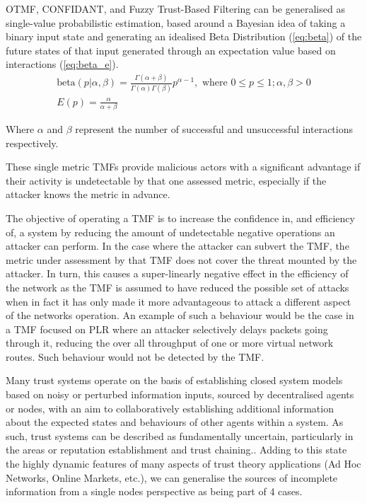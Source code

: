 OTMF, CONFIDANT, and Fuzzy Trust-Based Filtering can be generalised as single-value probabilistic estimation, based around a Bayesian idea of taking a binary input state and generating an idealised Beta Distribution (\ref{eq:beta}) of the future states of that input generated through an expectation value based on interactions (\ref{eq:beta_e}).
\begin{align}
  \label{eq:beta}
  \text{beta}(p|\alpha,\beta) = \frac{\Gamma(\alpha + \beta)}{\Gamma(\alpha)\Gamma(\beta)}p^{\alpha-1},\text{ where } 0 \leq p \leq 1; \alpha,\beta > 0\\
  \label{eq:beta_e}
  E(p) = \frac{\alpha}{\alpha + \beta}
\end{align}

Where $\alpha$ and $\beta$ represent the number of successful and unsuccessful interactions respectively.

These single metric TMFs provide malicious actors with a significant advantage if their activity is undetectable by that one assessed metric, especially if the attacker knows the metric in advance.

The objective of operating a TMF is to increase the confidence in, and efficiency of, a system by reducing the amount of undetectable negative operations an attacker can perform.
In the case where the attacker can subvert the TMF, the metric under assessment by that TMF does not cover the threat mounted by the attacker.
In turn, this causes a super-linearly negative effect in the efficiency of the network as the TMF is assumed to have reduced the possible set of attacks when in fact it has only made it more advantageous to attack a different aspect of the networks operation.
An example of such a behaviour would be the case in a TMF focused on PLR where an attacker selectively delays packets going through it, reducing the over all throughput of one or more virtual network routes.
Such behaviour would not be detected by the TMF.

Many trust systems operate on the basis of establishing closed system models based on noisy or perturbed information inputs, sourced by decentralised agents or nodes, with an aim to collaboratively establishing additional information about the expected states and behaviours of other agents within a system.
As such, trust systems can be described as fundamentally uncertain, particularly in the areas or reputation establishment and trust chaining.\cite{someone}.
Adding to this state the highly dynamic features of many aspects of trust theory applications (Ad Hoc Networks, Online Markets, etc.), we can generalise the sources of incomplete information from a single nodes perspective as being part of 4 cases.

